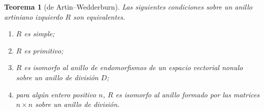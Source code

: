 \documentclass{report}
\newtheorem{theorem}{Teorema}
\begin{document}
  \begin{theorem}[de Artin--Wedderburn]
    Las siguientes condiciones sobre un anillo artiniano izquierdo \(R\) son equivalentes.
    \begin{enumerate}
      \item
        \label{property:artin--wedderburn_simple-ring}
        \(R\) es simple;
      \item
        \label{property:artin--wedderburn_primitive-ring}
        \(R\) es primitivo;
      \item
        \label{property:artin--wedderburn_endomorphism-ring}
        \(R\) es isomorfo al anillo de endomorfismos de un espacio vectorial nonulo sobre un anillo de división \(D\);
      \item
        \label{property:artin--wedderburn_matrix-ring}
        para algún entero positivo \(n\), \(R\) es isomorfo al anillo formado por las matrices \(n \times n\) sobre un anillo de división.
    \end{enumerate}
  \end{theorem}
\end{document}
